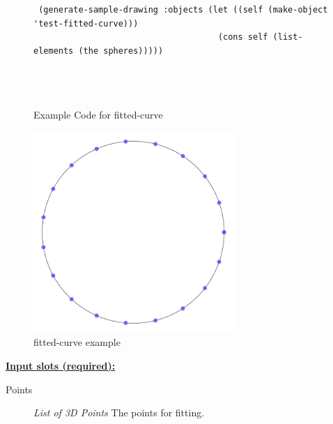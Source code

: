 \documentclass [11pt]{book}
\begin{document}
\begin{itemize}
\begin{figure}
\begin{lrbox}{\boxedverb}
\begin{minipage}{\linewidth}
{\begin{verbatim}
 (generate-sample-drawing :objects (let ((self (make-object 'test-fitted-curve)))
                                     (cons self (list-elements (the spheres)))))


 
\end{verbatim}}
\end{minipage}
\end{lrbox}
\fbox{\usebox{\boxedverb}}

\caption{Example Code for fitted-curve}

\label{fig:example-code-fitted-curve}

\end{figure}

\begin{figure}
\begin{center}
\includegraphics[width=3in,height=3in]{../images/example-fitted-curve.pdf}
\end{center}

\caption{fitted-curve example}

\label{fig:fitted-curve}

\end{figure}





\textbf{
\underline{Input slots (required):}}

\begin{description}

\item [Points]
\emph{List of 3D Points} The points for fitting.


\end{description}







\end{itemize}
\end{document}
